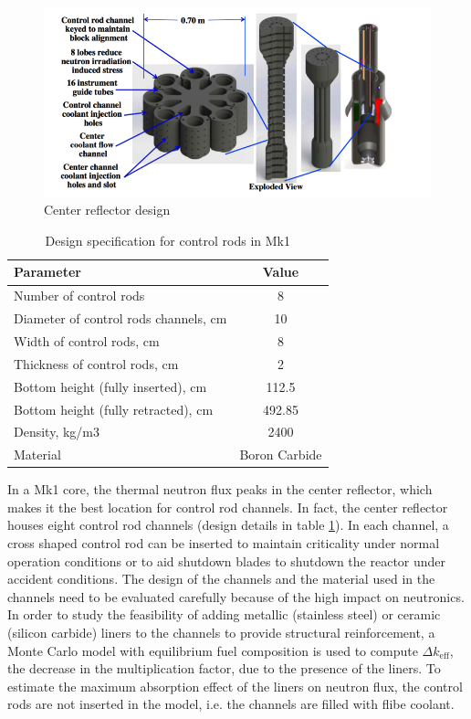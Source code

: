 \documentclass{elsarticle}
\newcommand{\keff}{{\ensuremath{k_{\mathrm{eff}}}} }
\begin{document}
\begin{figure}
    \centering
    \includegraphics[width = \textwidth]{images/design/Mk1_cr_design.png}
    \caption{Center reflector design}
    \label{fig:Mk1_cr}
\end{figure}



\begin{table}[h]
\centering
  \begin{tabular}{lc}
  \hline
     Parameter  & Value  \\
     \hline
       Number of control rods & 8\\
       Diameter of control rods channels, cm & 10\\
       Width of control rods, cm & 8\\
       Thickness of control rods, cm & 2\\
       Bottom height (fully inserted), cm & 112.5 \\
       Bottom height (fully retracted), cm & 492.85\\
       Density, kg/m3 & 2400\\
       Material & Boron Carbide\\
       \hline
  \end{tabular}
  \caption{Design specification for control rods in Mk1}
  \label{tab:cr_dim_Mk1}
\end{table}

In a Mk1 core, the thermal neutron flux peaks in the center reflector, which makes it the best location for control rod channels. In fact, the center reflector houses eight control rod channels (design details in table \ref{tab:cr_dim_Mk1}). In each channel, a cross shaped control rod can be inserted to maintain criticality under normal operation conditions or to aid shutdown blades to shutdown the reactor under accident conditions. The design of the channels and the material used in the channels need to be evaluated carefully because of the high impact on neutronics. 
In order to study the feasibility of adding metallic (stainless steel) or ceramic (silicon carbide) liners to the channels to provide structural reinforcement, a Monte Carlo model with equilibrium fuel composition is used to compute $\Delta \keff$, the decrease in the multiplication factor, due to the presence of the liners. 
To estimate the maximum absorption effect of the liners on neutron flux, the control rods are not inserted in the model, i.e. the channels are filled with flibe coolant.
\end{document}
